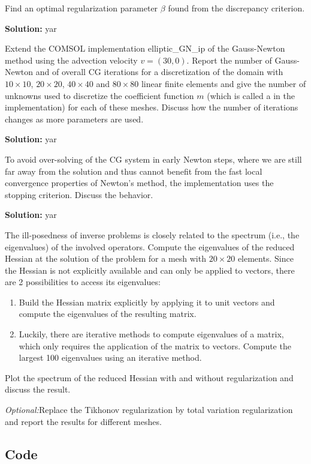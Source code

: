\documentclass[11pt]{article}
\newenvironment{solution}{\begin{trivlist}\item[]{\bf Solution:}}
                      {\end{trivlist}}
\begin{document}
\begin{enumerate}
\item[(a)]Find an optimal regularization parameter $\beta$ found from the
	  discrepancy criterion.

\begin{solution}
yar
\end{solution}


\item[(b)]Extend the COMSOL implementation elliptic\_GN\_ip of the
	  Gauss-Newton method using the advection velocity
	  $v=(30,0)$. Report the number of Gauss-Newton and of overall
	  CG iterations for a discretization of the domain with $10
	  \times 10$, $20 \times 20$, $40 \times 40$ and $80 \times 80$
	  linear finite elements and give the number of unknowns used to
	  discretize the coefficient function $m$ (which is called a in
	  the implementation) for each of these meshes. Discuss how the
	  number of iterations changes as more parameters are used. 

\begin{solution}
yar
\end{solution}

\item[(c)]To avoid over-solving of the CG system in early Newton steps,
	  where we are still far away from the solution and thus cannot
	  benefit from the fast local convergence properties of Newton’s
	  method, the implementation uses the stopping
	  criterion. Discuss the behavior.  


\begin{solution}
yar
\end{solution}

\item[(d)]The ill-posedness of inverse problems is closely related to
	  the spectrum (i.e., the eigenvalues) of the involved
	  operators. Compute the eigenvalues of the reduced Hessian at
	  the solution of the problem for a mesh with $20 \times 20$
	  elements. Since the Hessian is not explicitly available and
	  can only be applied to vectors, there are 2 possibilities to
	  access its eigenvalues: 
\begin{enumerate}
\item[$\bullet$] Build the Hessian matrix explicitly by applying it to
	     unit vectors and compute the eigenvalues of the resulting
	     matrix. 
\item[$\bullet$] Luckily, there are iterative methods to compute
	     eigenvalues of a matrix, which only requires the
	     application of the matrix to vectors. Compute the largest
	     100 eigenvalues using an iterative method. 
\end{enumerate}
Plot the spectrum of the reduced Hessian with and without regularization 
	  and discuss the result. 

\item[(e)]\textit{Optional:}Replace the Tikhonov regularization by total
	  variation regularization and report the results for different
	  meshes. 
\end{enumerate}

\newpage
\subsection*{Code}
%
\end{document}

